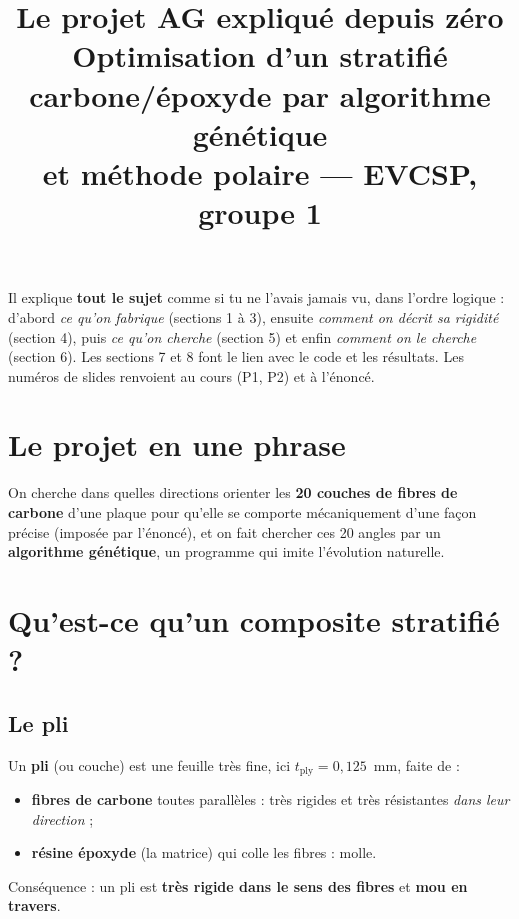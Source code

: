 \documentclass[11pt,a4paper]{article}
\title{\textbf{Le projet AG expliqué depuis zéro}\\[0.3em]
\large Optimisation d'un stratifié carbone/époxyde par algorithme génétique\\
et méthode polaire --- EVCSP, groupe 1}
\author{}
\date{}
\begin{document}
\maketitle
\vspace{-3em}

\begin{idee}
Il explique \textbf{tout le sujet} comme si tu ne l'avais jamais vu, dans
l'ordre logique : d'abord \emph{ce qu'on fabrique} (sections 1 à 3),
ensuite \emph{comment on décrit sa rigidité} (section 4), puis \emph{ce qu'on
cherche} (section 5) et enfin \emph{comment on le cherche} (section 6). Les
sections 7 et 8 font le lien avec le code et les résultats. Les numéros de
slides renvoient au cours (P1, P2) et à l'énoncé.
\end{idee}

\tableofcontents
\newpage

\section{Le projet en une phrase}
On cherche dans quelles directions orienter les \textbf{20 couches de fibres
de carbone} d'une plaque pour qu'elle se comporte mécaniquement d'une façon
précise (imposée par l'énoncé), et on fait chercher ces 20 angles par un
\textbf{algorithme génétique}, un programme qui imite l'évolution naturelle.

\section{Qu'est-ce qu'un composite stratifié ?}
\subsection{Le pli}
Un \textbf{pli} (ou couche) est une feuille très fine, ici
$t_{\text{ply}} = 0{,}125$~mm, faite de :
\begin{itemize}
  \item \textbf{fibres de carbone} toutes parallèles : très rigides et très
        résistantes \emph{dans leur direction} ;
  \item \textbf{résine époxyde} (la \og matrice\fg) qui colle les fibres :
        molle.
\end{itemize}
Conséquence : un pli est \textbf{très rigide dans le sens des fibres} et
\textbf{mou en travers}.
\end{document}
